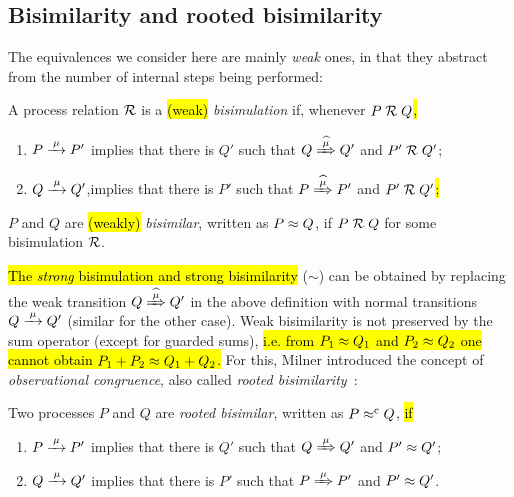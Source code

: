 \subsection{Bisimilarity and rooted bisimilarity}
\label{ss:BiEx}

The equivalences we consider here are mainly \emph{weak} ones, in that they
abstract from the number of internal steps being performed:
\begin{definition}%
\label{d:wb}
A process relation ${{\cal R}}$ is a \hl{(weak)} \emph{bisimulation} if, whenever
 $P\mathrel{\cal R} Q$\hl{,} %
\begin{enumerate}
\item $P \arr\mu P'$ implies that there is $Q'$ such that $Q \Arcap \mu Q'$ and $P' \mathrel{\cal R} Q'$;
\item $Q \arr\mu Q'$,implies that there is $P'$ such that $P \Arcap
  \mu P'$ and $P' \mathrel{\cal R} Q'$\hl{;}
\end{enumerate}
 $P$ and $Q$ are \hl{(weakly)} \emph{bisimilar},
written as $P \approx Q$, if $P \mathrel{\cal R} Q$ for some bisimulation ${\cal R}$.
\end{definition}

\hl{The \emph{strong} bisimulation and strong bisimilarity} ($\sim$)
can be obtained by replacing the weak transition $Q\Arcap\mu Q'$ in the above
definition with normal transitions $Q \arr \mu Q'$ (similar for the other case).
Weak bisimilarity is not preserved by the sum operator (except for
guarded sums), \hl{i.e. from $P_1 \approx Q_1$ and $P_2 \approx Q_2$ one
  cannot obtain $P_1 + P_2 \approx Q_1 + Q_2$.}
For this, Milner introduced the concept of \emph{observational congruence}, also called \emph{rooted
  bisimilarity}~\cite{Gorrieri:2015jt,Sangiorgi:2011ut}:
\begin{definition}%
\label{d:rootedBisimilarity}
Two processes $P$ and $Q$ are \emph{rooted bisimilar}, written as $P
\mathrel{\approx^{\rm{c}}} Q$, \hl{if} %
\begin{enumerate}
 \item  $P \arr\mu P'$ implies that there is $Q'$ such that $Q
   \Arr\mu Q'$ and $P' \approx Q'$;
 \item  $Q \arr\mu Q'$ implies that there is $P'$ such that $P
   \Arr\mu P'$ and $P' \approx Q'$\enspace.
\end{enumerate}
\end{definition}


